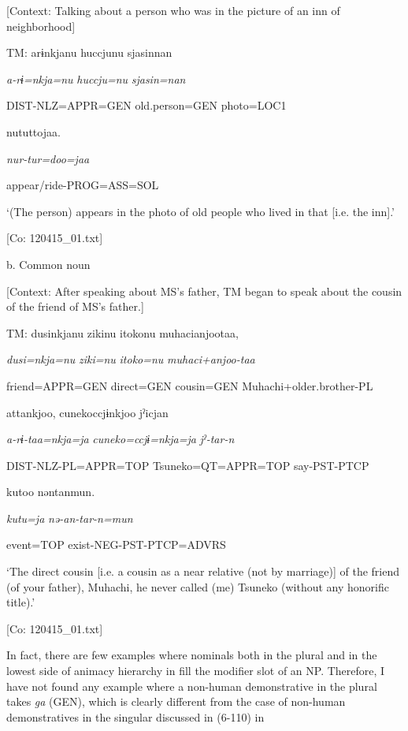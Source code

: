     [Context: Talking about a person who was in the picture of an inn of neighborhood]

    TM:  arɨnkjanu  huccjunu  sjasinnan

      \textit{a-rɨ=nkja=nu}  \textit{huccju=nu}  \textit{sjasin=nan}

      DIST-NLZ=APPR=GEN  old.person=GEN  photo=LOC1

      nututtojaa.

      \textit{nur-tur=doo=jaa}

      appear/ride-PROG=ASS=SOL

      ‘(The person) appears in the photo of old people who lived in that [i.e. the inn].’

      [Co: 120415\_01.txt]

  b.  Common noun

    [Context: After speaking about MS’s father, TM began to speak about the cousin of the friend of MS’s father.]

    TM:  dusinkjanu  zikinu  {\textbar}itoko{\textbar}nu  muhacianjootaa,

      \textit{dusi=nkja=nu}  \textit{ziki=nu}  \textit{itoko=nu}  \textit{muhaci+anjoo-taa}

      friend=APPR=GEN  direct=GEN  cousin=GEN  Muhachi+older.brother-PL

      attankjoo,  cunekoccjɨnkjoo  jˀicjan

      \textit{a-rɨ-taa=nkja=ja}  \textit{cuneko=ccjɨ=nkja=ja}  \textit{jˀ-tar-n}

      DIST-NLZ-PL=APPR=TOP  Tsuneko=QT=APPR=TOP  say-PST-PTCP

      kutoo  nəntanmun.

      \textit{kutu=ja}  \textit{nə-an-tar-n=mun}

      event=TOP  exist-NEG-PST-PTCP=ADVRS

      ‘The direct cousin [i.e. a cousin as a near relative (not by marriage)] of the friend (of your father), Muhachi, he never called (me) Tsuneko (without any honorific title).’

      [Co: 120415\_01.txt]

In fact, there are few examples where nominals both in the plural and in the lowest side of animacy hierarchy in  fill the modifier slot of an NP. Therefore, I have not found any example where a non-human demonstrative in the plural takes \textit{ga} (GEN), which is clearly different from the case of non-human demonstratives in the singular discussed in (6-110) in 

